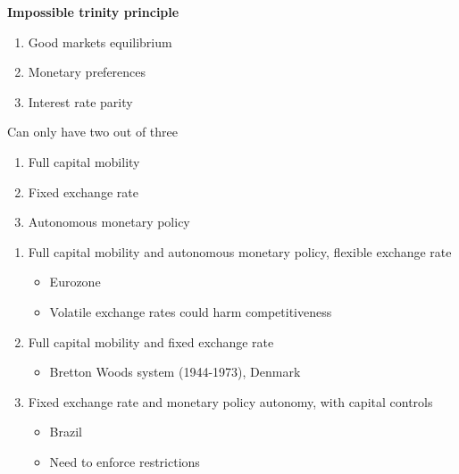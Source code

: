 \documentclass{beamer}
\begin{document}
\begin{frame}
  \textbf{Impossible trinity principle}
  \begin{enumerate}
    \item Good markets equilibrium
    \item Monetary preferences
    \item Interest rate parity
  \end{enumerate}
  Can only have two out of three
  \begin{enumerate}
    \item Full capital mobility
    \item Fixed exchange rate
    \item Autonomous monetary policy
  \end{enumerate}
\end{frame}


\begin{frame}
  \begin{enumerate}
    \item Full capital mobility and autonomous monetary policy, flexible exchange rate
    \begin{itemize}
      \item Eurozone
      \item Volatile exchange rates could harm competitiveness
    \end{itemize}
    \item Full capital mobility and fixed exchange rate
    \begin{itemize}
      \item Bretton Woods system (1944-1973), Denmark
    \end{itemize}
    \item Fixed exchange rate and monetary policy autonomy, with capital controls
    \begin{itemize}
      \item Brazil
      \item Need to enforce restrictions
    \end{itemize}
  \end{enumerate}
\end{frame}
\end{document}
